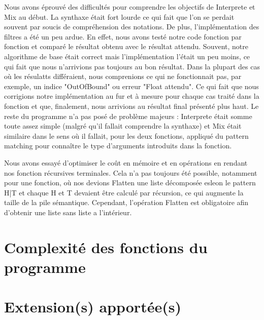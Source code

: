 \documentclass[a4paper,12pt]{article}
\begin{document}
Nous avons éprouvé des difficultés pour comprendre les objectifs de Interprete et Mix au début. La synthaxe était fort lourde ce qui fait que
l'on se perdait souvent par soucis de compréhension des notations. De plus, l'implémentation des filtres a été un peu ardue. En effet,
nous avons testé notre code fonction par fonction et comparé le résultat obtenu avec le résultat attendu. Souvent, notre algorithme de base était correct
mais l'implémentation l'était un peu moins, ce qui fait que nous n'arrivions pas toujours au bon résultat. Dans la plupart des cas où les résulatts différaient,
nous comprenions ce qui ne fonctionnait pas, par exemple, un indice "OutOfBound" ou erreur "Float attendu". Ce qui fait que nous corrigions notre implémentation
au fur et à mesure pour chaque cas traité dans la fonction et que, finalement, nous arrivions au résultat final présenté plus haut. Le reste du programme
n'a pas posé de problème majeurs : Interprete était somme toute assez simple (malgré qu'il fallait comprendre la synthaxe) et Mix était similaire dans le sens
où il fallait, pour les deux fonctions, appliqué du pattern matching pour connaître le type d'arguments introduits dans la fonction.

Nous avons essayé d'optimiser le coût en mémoire et en opérations en rendant nos fonction récursives terminales. Cela n'a pas toujours été possible,
notamment pour une fonction, où nos devions Flatten une liste décomposée esleon le pattern H|T et chaque H et T devaient être calculé par récursion,
ce qui augmente la taille de la pile sémantique. Cependant, l'opération Flatten est obligatoire afin d'obtenir une liste sans liste a l'intérieur.

\section{Complexité des fonctions du programme}

\section{Extension(s) apportée(s)}
\end{document}
